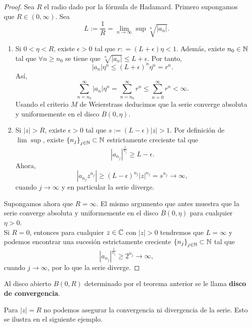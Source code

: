 \begin{proof}
Sea $\displaystyle R $ el radio dado por la fórmula de Hadamard. Primero supongamos que $\displaystyle R \in \left(0,\infty\right)  $. Sea 
\[L :=\frac{1}{R}=\lim_{n \to \infty }\sup \sqrt[n]{ \left|a_{n}\right|} .\]
\begin{enumerate}
	\item Si $\displaystyle 0< \eta < R $, existe $\displaystyle \epsilon > 0 $ tal que $\displaystyle r : = \left(L + \epsilon \right)\eta < 1 $. Además, existe $\displaystyle n_{0} \in \mathbb{N} $ tal que $\displaystyle \forall n \geq n_{0} $ se tiene que $\displaystyle \sqrt[n]{ \left|a_{n}\right|} \leq L + \epsilon $. Por tanto, 
		\[ \left|a_{n}\right|\eta^{n}\leq \left(L + \epsilon \right)^{n}\eta^{n}=r^{n} .\]
		Así, 
		\[\sum^{\infty}_{n =n_{0}} \left|a_{n}\right|\eta^{n} = \sum^{\infty}_{n = n_{0}}r^{n}\leq \sum^{\infty}_{n = 0}r^{n}< \infty .\]
	Usando el criterio $\displaystyle M $ de Weierstrass deducimos que la serie converge absoluta y uniformemente en el disco $\displaystyle \overline{B}\left(0, \eta\right) $. 
	\item Si $\displaystyle \left|z\right| > R $, existe $\displaystyle \epsilon > 0 $ tal que $\displaystyle s:=\left(L-\epsilon \right) \left|z\right| > 1 $. Por definición de $\displaystyle \lim\sup  $, existe $\displaystyle \left\{ n_{j}\right\} _{j \in \mathbb{N}}\subset\mathbb{N} $ estrictamente creciente tal que 
		\[ \left|a_{n_{j}}\right|^{\frac{1}{n_{j}}}\geq L-\epsilon  .\]
		Ahora, 
		\[ \left|a_{n_{j}}z^{n_{j}}\right|\geq \left(L-\epsilon \right)^{n_{j}} \left|z\right|^{n_{j}} =s^{n_{j}} \to \infty ,\]
		cuando $\displaystyle j \to \infty $ y en particular la serie diverge. 
\end{enumerate}
Supongamos ahora que $\displaystyle R = \infty $. El mismo argumento que antes muestra que la serie converge absoluta y uniformemente en el disco $\displaystyle \overline{B}\left(0, \eta\right) $ para cualquier $\displaystyle \eta > 0 $. \\

Si $\displaystyle R = 0 $, entonces para cualquier $\displaystyle z \in \mathbb{C} $ con $\displaystyle \left|z\right| > 0 $ tendremos que $\displaystyle L = \infty  $ y podemos encontrar una sucesión estrictamente creciente $\displaystyle \left\{ n_{j}\right\} _{j \in \mathbb{N}}\subset \mathbb{N} $ tal que 
\[ \left|a_{n_{j}}\right|^{\frac{1}{n_{j}}}\geq 2^{n_{j}} \to \infty ,\]
cuando $\displaystyle j \to \infty $, por lo que la serie diverge.
\end{proof}
\begin{notation}
Al disco abierto $\displaystyle B\left(0, R\right) $ determinado por el teorema anterior se le llama \textbf{disco de convergencia}. 
\end{notation}
\begin{observation}
Para $\displaystyle \left|z\right|=R $ no podemos asegurar la convergencia ni divergencia de la serie. Esto se ilustra en el siguiente ejemplo.
\end{observation}

